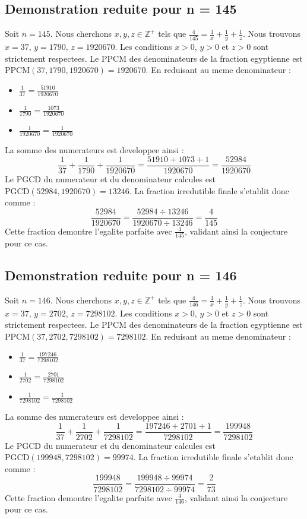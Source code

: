 \documentclass[11pt,a4paper]{article}
\begin{document}
\subsection{Demonstration reduite pour n = 145}
Soit $n = 145$. Nous cherchons $x, y, z \in \mathbb{Z}^{+}$ tels que $\frac{4}{145} = \frac{1}{x} + \frac{1}{y} + \frac{1}{z}$.
Nous trouvons $x = 37$, $y = 1790$, $z = 1920670$.
Les conditions $x > 0$, $y > 0$ et $z > 0$ sont strictement respectees.
Le PPCM des denominateurs de la fraction egyptienne est $\text{PPCM}(37, 1790, 1920670) = 1920670$.
En reduisant au meme denominateur :
\begin{itemize}
    \item $\frac{1}{37} = \frac{51910}{1920670}$
    \item $\frac{1}{1790} = \frac{1073}{1920670}$
    \item $\frac{1}{1920670} = \frac{1}{1920670}$
\end{itemize}
La somme des numerateurs est developpee ainsi :
$$ \frac{1}{37} + \frac{1}{1790} + \frac{1}{1920670} = \frac{51910 + 1073 + 1}{1920670} = \frac{52984}{1920670} $$
Le PGCD du numerateur et du denominateur calcules est $\text{PGCD}(52984, 1920670) = 13246$.
La fraction irredutible finale s'etablit donc comme :
$$ \frac{52984}{1920670} = \frac{52984 \div 13246}{1920670 \div 13246} = \frac{4}{145} $$
Cette fraction demontre l'egalite parfaite avec $\frac{4}{145}$, validant ainsi la conjecture pour ce cas.

\subsection{Demonstration reduite pour n = 146}
Soit $n = 146$. Nous cherchons $x, y, z \in \mathbb{Z}^{+}$ tels que $\frac{4}{146} = \frac{1}{x} + \frac{1}{y} + \frac{1}{z}$.
Nous trouvons $x = 37$, $y = 2702$, $z = 7298102$.
Les conditions $x > 0$, $y > 0$ et $z > 0$ sont strictement respectees.
Le PPCM des denominateurs de la fraction egyptienne est $\text{PPCM}(37, 2702, 7298102) = 7298102$.
En reduisant au meme denominateur :
\begin{itemize}
    \item $\frac{1}{37} = \frac{197246}{7298102}$
    \item $\frac{1}{2702} = \frac{2701}{7298102}$
    \item $\frac{1}{7298102} = \frac{1}{7298102}$
\end{itemize}
La somme des numerateurs est developpee ainsi :
$$ \frac{1}{37} + \frac{1}{2702} + \frac{1}{7298102} = \frac{197246 + 2701 + 1}{7298102} = \frac{199948}{7298102} $$
Le PGCD du numerateur et du denominateur calcules est $\text{PGCD}(199948, 7298102) = 99974$.
La fraction irredutible finale s'etablit donc comme :
$$ \frac{199948}{7298102} = \frac{199948 \div 99974}{7298102 \div 99974} = \frac{2}{73} $$
Cette fraction demontre l'egalite parfaite avec $\frac{4}{146}$, validant ainsi la conjecture pour ce cas.
\end{document}
